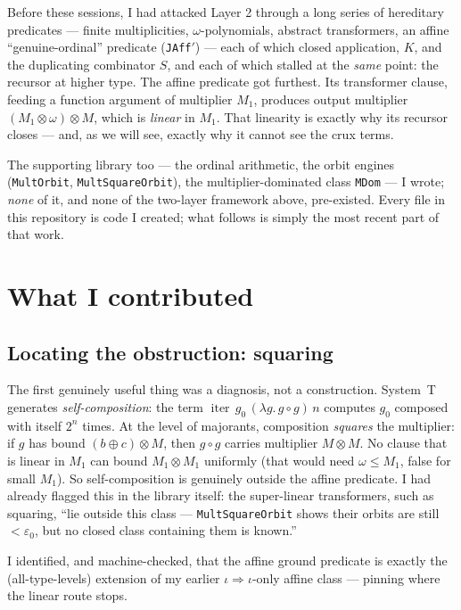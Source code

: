 \documentclass[11pt]{article}
\newcommand{\eps}{\varepsilon_0}
\newcommand{\iterop}{\operatorname{iter}}
\newcommand{\code}[1]{\texttt{#1}}
\newcommand{\ii}{\iota}
\newcommand{\arr}{\Rightarrow}
\theoremstyle{definition}
\begin{document}
Before these sessions, I had attacked Layer 2 through a long series of
hereditary predicates --- finite multiplicities, $\omega$-polynomials, abstract
transformers, an affine ``genuine-ordinal'' predicate (\code{JAff$'$}) --- each
of which closed application, $K$, and the duplicating combinator $S$, and each
of which stalled at the \emph{same} point: the recursor at higher type. The
affine predicate got furthest. Its transformer clause, feeding a function
argument of multiplier $M_1$, produces output multiplier $(M_1\otimes\omega)
\otimes M$, which is \emph{linear} in $M_1$. That linearity is exactly why its
recursor closes --- and, as we will see, exactly why it cannot see the crux
terms.

The supporting library too --- the ordinal arithmetic, the orbit engines
(\code{MultOrbit}, \code{MultSquareOrbit}), the multiplier-dominated class
\code{MDom} --- I wrote; \emph{none} of it, and none of the two-layer framework
above, pre-existed. Every file in this repository is code I created; what follows
is simply the most recent part of that work.

\section{What I contributed}

\subsection{Locating the obstruction: squaring}

The first genuinely useful thing was a diagnosis, not a construction. System~T
generates \emph{self-composition}: the term $\iterop\,g_0\,(\lambda g.\,g\circ
g)\,n$ computes $g_0$ composed with itself $2^n$ times. At the level of
majorants, composition \emph{squares} the multiplier: if $g$ has bound
$(b\oplus c)\otimes M$, then $g\circ g$ carries multiplier $M\otimes M$. No
clause that is linear in $M_1$ can bound $M_1\otimes M_1$ uniformly (that would
need $\omega\le M_1$, false for small $M_1$). So self-composition is genuinely
outside the affine predicate. I had already flagged this in the library itself: the
super-linear transformers, such as squaring, ``lie outside this class ---
\code{MultSquareOrbit} shows their orbits are still $<\eps$, but no closed class
containing them is known.''

I identified, and machine-checked, that the affine ground predicate is exactly
the (all-type-levels) extension of my earlier $\iota\arr\ii$-only affine
class --- pinning where the linear route stops.
\end{document}
